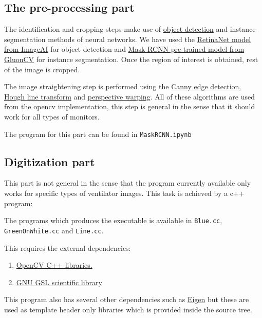 	\subsection{The pre-processing part}
	
	The identification and cropping steps make use of \href{https://en.wikipedia.org/wiki/Object_detection}{object detection} and instance segmentation methods of neural networks.
	We have used the \href{https://github.com/OlafenwaMoses/ImageAI}{RetinaNet model from ImageAI} for object detection and \href{https://gluon-cv.mxnet.io/build/examples_instance/demo_mask_rcnn.html}{Mask-RCNN pre-trained model from GluonCV} for instance segmentation.
	Once the region of interest is obtained, rest of the image is cropped.
	
	The image straightening step is performed using the \href{https://en.wikipedia.org/wiki/Canny_edge_detector}{Canny edge detection}, \href{https://en.wikipedia.org/wiki/Hough_transform}{Hough line transform} and \href{https://en.wikipedia.org/wiki/3D_projection#Perspective_projection}{perspective warping}.
	All of these algorithms are used from the opencv implementation, this step is general in the sense that it should work for all types of monitors.
	
	\begin{center}
		The program for this part can be found in {\tt{MaskRCNN.ipynb}}
	\end{center}

	\subsection{Digitization part}
	This part is not general in the sense that the program currently available only works for specific types of ventilator images.
	This task is achieved by a c++ program:
	\begin{center}
		The programs which produces the executable is available in {\tt{Blue.cc}}, {\tt{GreenOnWhite.cc}} and {\tt{Line.cc}}.
	\end{center}
	This requires the external dependencies:
	\begin{enumerate}
		\item
		\href{https://opencv.org/}{OpenCV C++ libraries.}

		\item
		\href{https://www.gnu.org/software/gsl/}{GNU GSL scientific library}
	\end{enumerate}
	This program also has several other dependencies such as \href{http://eigen.tuxfamily.org/index.php?title=Main_Page}{Eigen} but these are used as template header only libraries which is provided inside the source tree.
	
